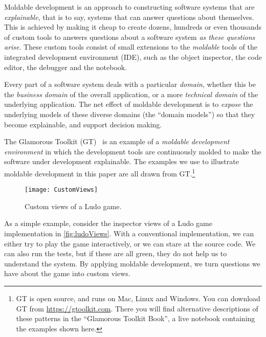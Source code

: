 \documentclass[acmsmall,screen,authorversion,nonacm]{acmart} %
\newcommand\cp[1]{\nbe{Cesare}{#1}{olive}} %
\newcommand\ws[1]{\nbe{Workshop}{#1}{teal}} %
\begin{document}
Moldable development is an approach to constructing software systems that are \emph{explainable}, that is to say, systems that can answer questions about themselves.
This is achieved by making it cheap to create dozens, hundreds or even thousands of custom tools to answers questions about a software system \emph{as these questions arise}.
These custom tools consist of small extensions to the \emph{moldable} tools of the integrated development environment (IDE), such as the object inspector, the code editor, the debugger and the notebook.

Every part of a software system deals with a particular \emph{domain}, whether this be the \emph{business domain} of the overall application, or a more \emph{technical domain}  of the underlying application.
The net effect of moldable development is to \emph{expose} the underlying models of these diverse domains (\ie the ``domain models'') 
so that they become explainable, and support decision making.

The Glamorous Toolkit (GT)~\cite{feenk23a} is an example of a \emph{moldable} \emph{development} \emph{environment} in which the development tools are continuously molded to make the software under development explainable.
The examples we use to illustrate moldable development in this paper are all drawn from GT.\footnote{GT is open source, and runs on Mac, Linux and Windows. You can download GT from \url{https://gtoolkit.com}.
There you will find alternative descriptions of these patterns in the ``Glamorous Toolkit Book'', a live notebook containing the examples shown here.}

\begin{figure}[h]
  \texttt{[image: CustomViews]}
  \caption{Custom views of a Ludo game.}
  \label{fig:ludoViews}
\end{figure}

As a simple example, consider the inspector views of a Ludo game implementation in \autoref{fig:ludoViews}.
With a conventional implementation, we can either try to play the game interactively, or we can stare at the source code.
We can also run the tests, but if these are all green, they do not help us to understand the system.
By applying moldable development, we turn questions we have about the game into custom views.
\end{document}
